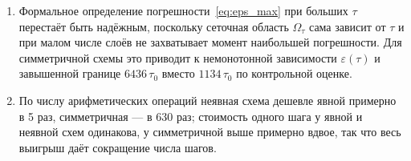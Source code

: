 \documentclass[12pt,a4paper]{article}
\begin{document}
\begin{enumerate}
\item Формальное определение погрешности~\eqref{eq:eps_max} при больших
$\tau$ перестаёт быть надёжным, поскольку сеточная область
$\Omega_\tau$ сама зависит от $\tau$ и при малом числе слоёв не
захватывает момент наибольшей погрешности. Для симметричной схемы это
приводит к немонотонной зависимости $\varepsilon(\tau)$ и завышенной
границе $6436\,\tau_0$ вместо $1134\,\tau_0$ по контрольной оценке.

\item По числу арифметических операций неявная схема дешевле явной
примерно в 5 раз, симметричная --- в 630 раз; стоимость одного шага у
явной и неявной схем одинакова, у симметричной выше примерно вдвое, так
что весь выигрыш даёт сокращение числа шагов.
\end{enumerate}
\end{document}
